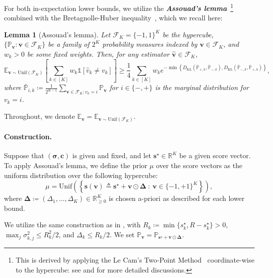 \documentclass{article}
\def\vc{{\bm{c}}}
\def\vs{{\bm{s}}}
\def\vv{{\bm{v}}}
\def\gF{{\mathcal{F}}}
\def\sP{{\mathbb{P}}}
\def\sR{{\mathbb{R}}}
\newcommand{\E}{\mathbb{E}}
\newcommand{\KL}{D_{\mathrm{KL}}}
\theoremstyle{plain}
\newtheorem{lemma}[theorem]{Lemma}
\theoremstyle{definition}
\theoremstyle{plain}
\newcommand{\indicator}{\mathds{1}}
\begin{document}
For both in-expectation lower bounds, we utilize the \textbf{\textit{Assouad's lemma}}~\citep{assouad1983,yu1997lecam}\footnote{This is derived by applying the Le Cam's Two-Point Method~\citep{lecam1973} coordinate-wise to the hypercube: see \citet{yu1997lecam} and \citet[Chapter 2]{tsybakov} for more detailed discussions.} combined with the Bretagnolle-Huber inequality~\citep{bretagnolle-huber}, which we recall here:
\begin{lemma}[Assouad's lemma]
\label{lem:assouad}
    Let $\gF_K = \{-1, 1\}^K$ be the hypercube, $\{\sP_{\vv} : \vv \in \gF_K \}$ be a family of $2^K$ probability measures indexed by $\vv \in \gF_K$, and $w_k > 0$ be some fixed weights.
    Then, for any estimator $\hat{\vv} \in \gF_K$,
    \begin{equation}
        \E_{\vv \sim \mathrm{Unif}(\gF_K)} \left[ \sum_{k \in [K]} w_k \indicator[\hat{v}_k \neq v_k] \right] \ge \frac{1}{4} \sum_{k \in [K]} w_k e^{- \min\left\{ \KL(\bar{\sP}_{+,k}, \bar{\sP}_{-,k}), \KL(\bar{\sP}_{-,k}, \bar{\sP}_{+,k}) \right\}},
    \end{equation}
    where $\bar{\sP}_{i,k} \coloneq \frac{1}{2^{K-1}} \sum_{\vv \in \gF_K : v_k = i} \sP_{\vv}$ for $i \in \{-, +\}$ is the marginal distribution for $v_k = i$.
\end{lemma}
Throughout, we denote $\E_{\vv} = \E_{\vv \sim \mathrm{Unif}(\gF_K)}$.


\paragraph{Construction.}
Suppose that $(\bm\sigma, \vc)$ is given and fixed, and let $\vs^\star \in \sR^K$ be a given score vector.
To apply Assouad's lemma, we define the prior $\mu$ over the score vectors as the uniform distribution over the following hypercube:
\begin{equation}
    \mu = \mathrm{Unif}\left( \left\{ \vs(\vv) \triangleq \vs^\star + \vv \odot \bm\Delta \ : \ \vv \in \{-1, +1\}^K \right\} \right),
\end{equation}
where $\bm{\Delta} \coloneq (\Delta_1, \dots, \Delta_K) \in \sR_{\geq 0}^K$ is chosen a-priori as described for each lower bound.

We utilize the same construction as in , with $R_k \coloneq \min\{s_k^\star, R - s_k^\star\}> 0$, $\max_j \sigma_{k,j}^2 \leq R_k^2 / 2$, and $\Delta_k \leq R_k / 2$.
We set $\sP_\vv = \sP_{\vs^\star + \vv \odot \bm\Delta}$.
\end{document}

